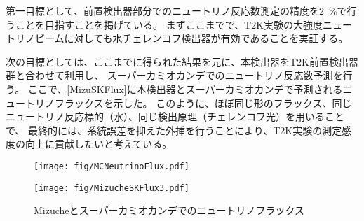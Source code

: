 第一目標として、前置検出器部分でのニュートリノ反応数測定の精度を\qty{2}{\percent}で行うことを目指すことを掲げている。
まずここまでで、T2K実験の大強度ニュートリノビームに対しても水チェレンコフ検出器が有効であることを実証する。

次の目標としては、ここまでに得られた結果を元に、本検出器をT2K前置検出器群と合わせて利用し、
スーパーカミオカンデでのニュートリノ反応数予測を行う。
ここで、\autoref{MizuSKFlux}に本検出器とスーパーカミオカンデで予測されるニュートリノフラックスを示した。
このように、ほぼ同じ形のフラックス、同じニュートリノ反応標的（水）、同じ検出原理（チェレンコフ光）を用いることで、
最終的には、系統誤差を抑えた外挿を行うことにより、T2K実験の測定感度の向上に貢献したいと考えている。

\begin{figure}[htbp]
  \begin{minipage}{0.47\textwidth}
    \centering
    \texttt{[image: fig/MCNeutrinoFlux.pdf]}
    \label{MizuFlux}
  \end{minipage}
  \hfill
  \begin{minipage}{0.47\textwidth}
    \centering
    \texttt{[image: fig/MizucheSKFlux3.pdf]}
    \label{SKFlux}
  \end{minipage}
  \caption[Mizucheとスーパーカミオカンデでのニュートリノフラックス]{Mizucheとスーパーカミオカンデでのニュートリノフラックス}
  \label{MizuSKFlux}
\end{figure}




